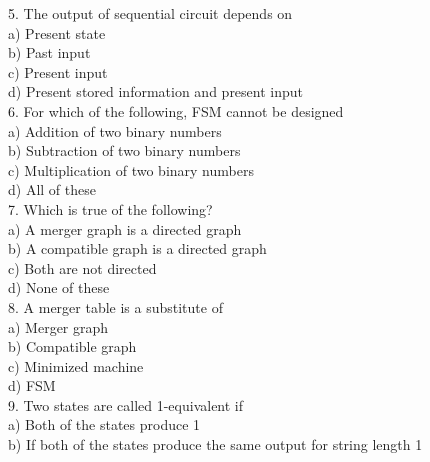 \documentclass{article}
\begin{document}
\begin{multicols}{2}
\vspace*{0.3cm}
5. The output of sequential circuit depends on\\
\hspace*{0.4cm} a) Present state\\
\hspace*{0.4cm} b) Past input\\
\hspace*{0.4cm} c) Present input\\
\hspace*{0.4cm} d) Present stored information and present
input\\

\vspace*{0.3cm}
6. For which of the following, FSM cannot be
designed\\
\hspace*{0.4cm} a) Addition of two binary numbers\\
\hspace*{0.4cm} b) Subtraction of two binary numbers\\
\hspace*{0.4cm} c) Multiplication of two binary numbers\\
\hspace*{0.4cm} d) All of these\\

\vspace*{0.3cm}
7. Which is true of the following?\\
\hspace*{0.4cm} a) A merger graph is a directed graph\\
\hspace*{0.4cm} b) A compatible graph is a directed graph\\
\hspace*{0.4cm} c) Both are not directed\\
\hspace*{0.4cm} d) None of these\\

\vspace*{0.3cm}
8. A merger table is a substitute of\\
\hspace*{0.4cm} a) Merger graph\\
\hspace*{0.4cm} b) Compatible graph\\
\hspace*{0.4cm} c) Minimized machine\\
\hspace*{0.4cm} d) FSM\\

\vspace*{0.3cm}
9. Two states are called 1-equivalent if\\
\hspace*{0.4cm} a) Both of the states produce 1\\
\hspace*{0.4cm} b) If both of the states produce the same
output for string length 1\\
\end{multicols}
\end{document}
